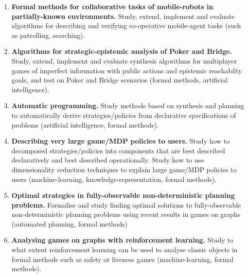 \documentclass[10,a4paper,sans]{moderncv}
\begin{document}
\begin{enumerate}
\item \textbf{Formal methods for collaborative tasks of mobile-robots in partially-known environments.} 
Study, extend, implement and evaluate algorithms for describing and verifying co-operative mobile-agent 
tasks (such as patrolling, searching).

\item \textbf{Algorithms for strategic-epistemic analysis of Poker and Bridge.} 
Study, extend, implement and evaluate synthesis algorithms for multiplayer
games of imperfect information with public actions and epistemic
reachabilty goals, and test on Poker and Bridge scenarios (formal methods, artificial intelligence).

\item \textbf{Automatic programming.} Study methods based on synthesis and planning to automatically derive 
strategies/policies from declarative specifications of problems (artificial intelligence, formal methods). 

\item \textbf{Describing very large game/MDP policies to users.} Study how to 
decomposed strategies/policies into components that are best described declaratively and best described operationally. 
Study how to use dimensionality reduction techniques to explain large game/MDP policies to 
users (machine-learning, knowledge-representation, formal methods).

\item \textbf{Optimal strategies in fully-observable non-deterministic planning problems.} 
Formalise and study finding optimal solutions to fully-observable non-deterministic planning problems  using recent results in games on graphs 
(automated planning, formal methods)

\item \textbf{Analysing games on graphs with reinforcement learning.} Study to what extent 
reinforcement learning can be used to analyse classic objects in formal methods such as safety or liveness games 
(machine-learning, formal methods).

% 
\end{enumerate}

% 

\end{document}
